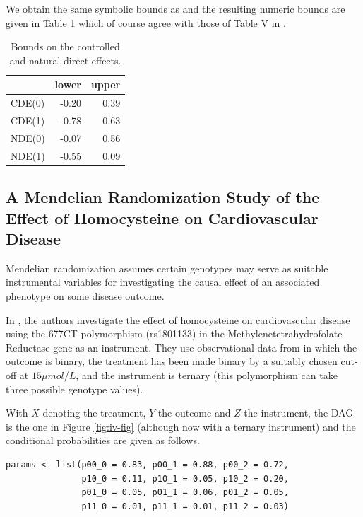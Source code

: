 We obtain the same symbolic bounds as \citet{sjolandernaturaldirecteffects} and the resulting numeric bounds are given in Table \ref{tab:mediation-bounds} which of course agree with those of Table V in \citet{sjolandernaturaldirecteffects}.

\begin{table}

\caption{\label{tab:mediation-bounds}Bounds on the controlled and natural direct effects.}
\centering
\begin{tabular}[t]{l|r|r}
\hline
  & lower & upper\\
\hline
CDE(0) & -0.20 & 0.39\\
\hline
CDE(1) & -0.78 & 0.63\\
\hline
NDE(0) & -0.07 & 0.56\\
\hline
NDE(1) & -0.55 & 0.09\\
\hline
\end{tabular}
\end{table}

\hypertarget{a-mendelian-randomization-study-of-the-effect-of-homocysteine-on-cardiovascular-disease}{%
\subsection{A Mendelian Randomization Study of the Effect of Homocysteine on Cardiovascular Disease}\label{a-mendelian-randomization-study-of-the-effect-of-homocysteine-on-cardiovascular-disease}}

Mendelian randomization \citep{mendelian} assumes certain genotypes may serve as suitable instrumental variables for investigating the causal effect of an associated phenotype on some disease outcome.

In \citet{st0232}, the authors investigate the effect of homocysteine on cardiovascular disease using the 677CT polymorphism (rs1801133) in the Methylenetetrahydrofolate Reductase gene as an instrument. They use observational data from \citet{meleady_thermolabile_2003} in which the outcome is binary, the treatment has been made binary by a suitably chosen cut-off at \(15\mu mol/L\), and the instrument is ternary (this polymorphism can take three possible genotype values).

With \(X\) denoting the treatment, \(Y\) the outcome and \(Z\) the instrument, the DAG is the one in Figure \ref{fig:iv-fig} (although now with a ternary instrument) and the conditional probabilities are given as follows.

\begin{verbatim}
params <- list(p00_0 = 0.83, p00_1 = 0.88, p00_2 = 0.72, 
               p10_0 = 0.11, p10_1 = 0.05, p10_2 = 0.20, 
               p01_0 = 0.05, p01_1 = 0.06, p01_2 = 0.05, 
               p11_0 = 0.01, p11_1 = 0.01, p11_2 = 0.03)
\end{verbatim}

